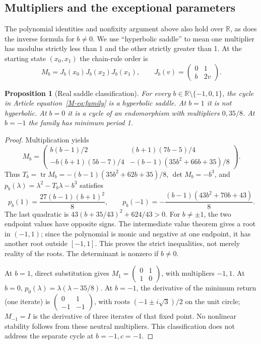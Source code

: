 \documentclass{jT}
\newcommand{\R}{\mathbb R}
\newtheorem{proposition}{Proposition}[section]
\begin{document}
\subsection{Multipliers and the exceptional parameters}\label{sec:saddle}
The polynomial identities and nonfixity argument above also hold over $\R$, as does the inverse formula for $b\ne0$. We use ``hyperbolic saddle'' to mean one multiplier has modulus strictly less than 1 and the other strictly greater than 1. At the starting state $(x_0,x_1)$ the chain-rule order is
\[
M_b=J_b(x_0)J_b(x_2)J_b(x_1),\qquad J_b(v)=\begin{pmatrix}0&1\\b&2v\end{pmatrix}.
\]
\begin{proposition}[Real saddle classification]\label{prop:saddle}
For every $b\in\R\setminus\{-1,0,1\}$, the cycle in Article equation~\eqref{M-eq:family} is a hyperbolic saddle. At $b=1$ it is not hyperbolic. At $b=0$ it is a cycle of an endomorphism with multipliers $0,35/8$. At $b=-1$ the family has minimum period 1.
\end{proposition}
\begin{proof}
Multiplication yields
\[
M_b=\begin{pmatrix}
b(b-1)/2 &(b+1)(7b-5)/4\\
-b(b+1)(5b-7)/4&-(b-1)(35b^2+66b+35)/8
\end{pmatrix}.
\]
Thus $T_b=\operatorname{tr}M_b=-(b-1)(35b^2+62b+35)/8$, $\det M_b=-b^3$, and $p_b(\lambda)=\lambda^2-T_b\lambda-b^3$ satisfies
\[
p_b(1)=\frac{27(b-1)(b+1)^2}{8},\qquad
p_b(-1)=-\frac{(b-1)(43b^2+70b+43)}8.
\]
The last quadratic is $43(b+35/43)^2+624/43>0$. For $b\ne\pm1$, the two endpoint values have opposite signs. The intermediate value theorem gives a root in $(-1,1)$; since the polynomial is monic and negative at one endpoint, it has another root outside $[-1,1]$. This proves the strict inequalities, not merely reality of the roots. The determinant is nonzero if $b\ne0$.

At $b=1$, direct substitution gives $M_1=\left(\begin{smallmatrix}0&1\\1&0\end{smallmatrix}\right)$, with multipliers $-1,1$. At $b=0$, $p_0(\lambda)=\lambda(\lambda-35/8)$. At $b=-1$, the derivative of the minimum return (one iterate) is $\left(\begin{smallmatrix}0&1\\-1&-1\end{smallmatrix}\right)$, with roots $(-1\pm i\sqrt3)/2$ on the unit circle; $M_{-1}=I$ is the derivative of three iterates of that fixed point. No nonlinear stability follows from these neutral multipliers. This classification does not address the separate cycle at $b=-1,c=-1$.
\end{proof}
\end{document}
